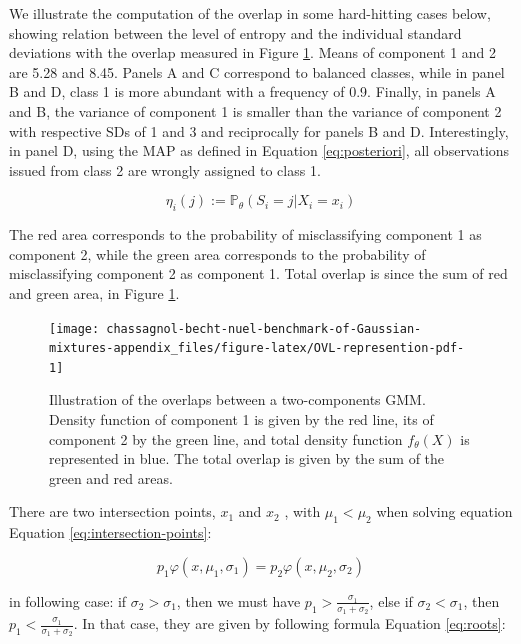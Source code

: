 We illustrate the computation of the overlap in some hard-hitting cases
below, showing relation between the level of entropy and the individual
standard deviations with the overlap measured in Figure
\ref{fig:OVL-represention-pdf}.
Means of component 1 and 2 are 5.28 and 8.45. Panels A and C correspond
to balanced classes, while in panel B and D, class 1 is more abundant
with a frequency of 0.9. Finally, in panels A and B, the variance of
component 1 is smaller than the variance of component 2 with respective
SDs of 1 and 3 and reciprocally for panels B and D. Interestingly, in
panel D, using the MAP as defined in Equation \eqref{eq:posteriori}, all
observations issued from class 2 are wrongly assigned to class 1.

\begin{equation}
        \eta_{i} (j) := \mathbb{P}_{\theta} (S_i=j |X_i=x_i)
    \label{eq:posteriori}
\end{equation}

The red area corresponds to the probability of misclassifying component 1 as
component 2, while the green area corresponds to the probability of
misclassifying component 2 as component 1. Total overlap is since the
sum of red and green area, in Figure
\ref{fig:OVL-represention-pdf}.

\begin{figure}

{\centering \texttt{[image: chassagnol-becht-nuel-benchmark-of-Gaussian-mixtures-appendix\_files/figure-latex/OVL-represention-pdf-1]} 

}

\caption{Illustration of the overlaps between a two-components GMM. Density function of component 1 is given by the red line, its of component 2 by the green line, and total density function $f_\theta(X)$ is represented in blue. The total overlap is given by the sum of the green and red areas.}\label{fig:OVL-represention-pdf}
\end{figure}

There are two intersection points, \(x_1\) and \(x_2\) , with
\(\mu_1 < \mu_2\) when solving equation Equation
\eqref{eq:intersection-points}:

\begin{equation}
p_1 \varphi(x, \mu_1, \sigma_1)  = p_2 \varphi(x, \mu_2, \sigma_2)
\label{eq:intersection-points}
\end{equation}

in following case: if \(\sigma_2 > \sigma_1\), then we must have
\(p_1 > \frac{\sigma_1}{\sigma_1 + \sigma_2}\), else if
\(\sigma_2 < \sigma_1\), then
\(p_1 < \frac{\sigma_1}{\sigma_1 + \sigma_2}\). In that case, they are
given by following formula Equation \eqref{eq:roots}:

